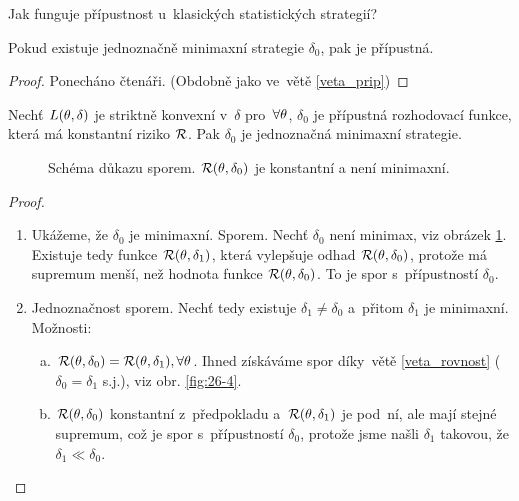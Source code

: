 Jak funguje přípustnost u~klasických statistických strategií?
\begin{theorem}\label{veta_mini}
	Pokud existuje jednoznačně minimaxní strategie $\delta_0$, pak je přípustná.\begin{proof}
		Ponecháno čtenáři. (Obdobně jako ve~větě \ref{veta_prip})
	\end{proof}
\end{theorem}
\begin{theorem}["Obrátka"]
	Nechť $L(\theta,\delta)$ je striktně konvexní v~$\delta$ pro~$\forall\theta$, $\delta_0$ je přípustná rozhodovací funkce, která má konstantní riziko $\mathcal{R}$. Pak $\delta_0$ je jednoznačná minimaxní strategie.
	\begin{figure}[h]
		\centering
		\caption{Schéma důkazu sporem. $ \mathcal{R}(\theta,\delta_0)$ je konstantní a není minimaxní.}
		\label{fig:26-3}
	\end{figure}
	
	\begin{proof}
		\begin{enumerate}[1)]
		\item Ukážeme, že $\delta_0$ je minimaxní. Sporem. Nechť $\delta_0$ není minimax, viz obrázek \ref{fig:26-3}. Existuje tedy funkce $\mathcal{R}(\theta,\delta_1)$, která  vylepšuje odhad $\mathcal{R}(\theta,\delta_0)$, protože má supremum menší, než hodnota funkce $\mathcal{R}(\theta,\delta_0)$. To je spor s~přípustností $\delta_0$.
		\item Jednoznačnost sporem. Nechť tedy existuje $\delta_1\neq\delta_0$ a~přitom $\delta_1$ je minimaxní. Možnosti:
		\begin{enumerate}[a)]
		\item $\mathcal{R}(\theta,\delta_0)=\mathcal{R}(\theta,\delta_1),\forall\theta$. Ihned získáváme spor díky~větě \ref{veta_rovnost} ($\delta_0=\delta_1$ s.j.), viz obr. \ref{fig:26-4}.
		\item $\mathcal{R}(\theta,\delta_0)$ konstantní z~předpokladu a~$\mathcal{R}(\theta,\delta_1)$ je pod~ní, ale mají stejné supremum, což je spor s~přípustností $\delta_0$, protože jsme našli $\delta_1$ takovou, že $\delta_1\ll\delta_0$.
		\end{enumerate}
	

\end{enumerate}
\end{proof}
\end{theorem}

